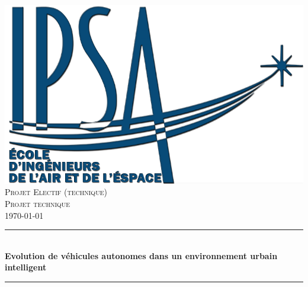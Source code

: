 \begin{titlepage}

\newcommand{\HRule}{\rule{\linewidth}{0.5mm}} %

\center %
 

\includegraphics[scale=0.6]{Graphics/logo.png}\\[1.5cm]

\textsc{\Large Projet Electif (technique)}\\[0.5cm] %
\textsc{\large Projet technique}\\[0.5cm] %

{\normalsize \today}\\[1.5cm]


\HRule \\[0.4cm]
{ \Large \bfseries Evolution de véhicules autonomes dans un environnement urbain intelligent}\\[0.4cm] %
\HRule \\[2.5cm]




\end{titlepage}
